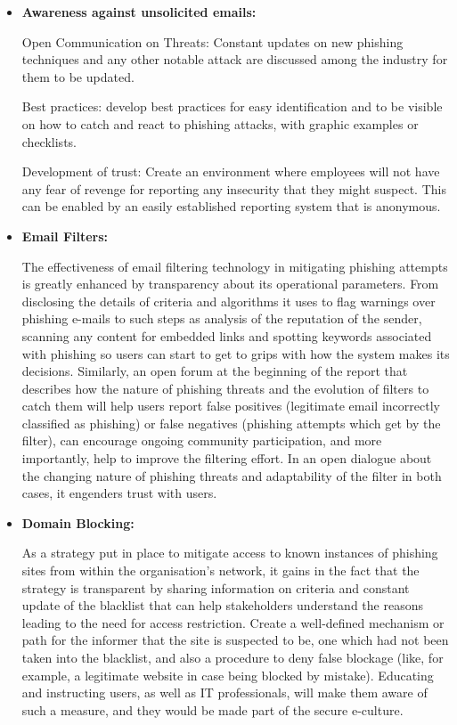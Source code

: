 \begin{itemize}
     \item \textbf{Awareness against unsolicited emails:  } 
     
     Open Communication on Threats: Constant updates on new phishing techniques and any other notable attack are discussed among the industry for them to be updated.
     
Best practices: develop best practices for easy identification and to be visible on how to catch and react to phishing attacks, with graphic examples or checklists.

Development of trust: Create an environment where employees will not have any fear of revenge for reporting any insecurity that they might suspect. This can be enabled by an easily established reporting system that is anonymous.

\item \textbf{Email Filters:} 

The effectiveness of email filtering technology in mitigating phishing attempts is greatly enhanced by transparency about its operational parameters. From disclosing the details of criteria and algorithms it uses to flag warnings over phishing e-mails to such steps as analysis of the reputation of the sender, scanning any content for embedded links and spotting keywords associated with phishing so users can start to get to grips with how the system makes its decisions. Similarly, an open forum at the beginning of the report that describes how the nature of phishing threats and the evolution of filters to catch them will help users report false positives (legitimate email incorrectly classified as phishing) or false negatives (phishing attempts which get by the filter), can encourage ongoing community participation, and more importantly, help to improve the filtering effort. In an open dialogue about the changing nature of phishing threats and adaptability of the filter in both cases, it engenders trust with users.

\item \textbf{Domain Blocking:} 

As a strategy put in place to mitigate access to known instances of phishing sites from within the organisation's network, it gains in the fact that the strategy is transparent by sharing information on criteria and constant update of the blacklist that can help stakeholders understand the reasons leading to the need for access restriction. Create a well-defined mechanism or path for the informer that the site is suspected to be, one which had not been taken into the blacklist, and also a procedure to deny false blockage (like, for example, a legitimate website in case being blocked by mistake). Educating and instructing users, as well as IT professionals, will make them aware of such a measure, and they would be made part of the secure e-culture.


\end{itemize}
